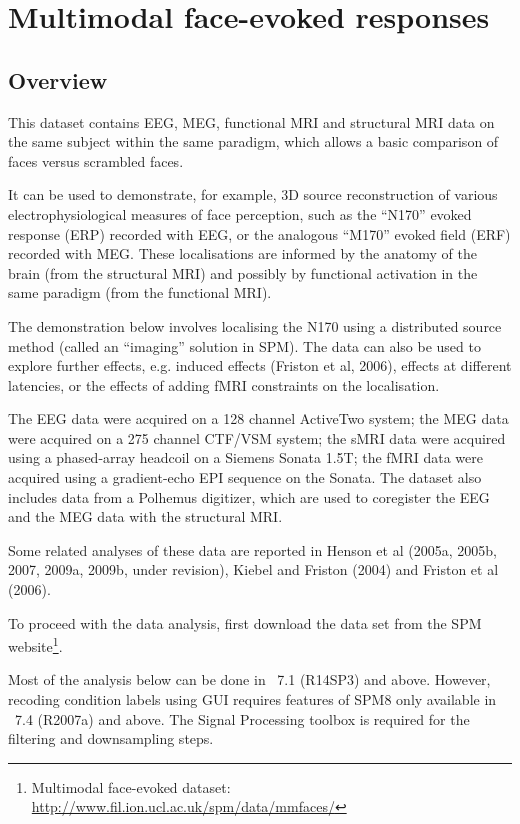 \chapter{Multimodal face-evoked responses \label{Chap:data:multimodal}}

\section{Overview}

This dataset contains EEG, MEG, functional MRI and structural MRI data on the same subject within the same paradigm, which allows a basic comparison of faces versus scrambled faces.

It can be used to demonstrate, for example, 3D source reconstruction of various electrophysiological measures of face perception, such as the ``N170'' evoked response (ERP) recorded with EEG, or the analogous ``M170'' evoked field (ERF) recorded with MEG. These localisations are informed by the anatomy of the brain (from the structural MRI) and possibly by functional activation in the same paradigm (from the functional MRI).

The demonstration below involves localising the N170 using a distributed source method (called an ``imaging'' solution in SPM). The data can also be used to explore further effects, e.g. induced effects (Friston et al, 2006), effects at different latencies, or the effects of adding fMRI constraints on the localisation.

The EEG data were acquired on a 128 channel ActiveTwo system; the MEG data were acquired on a 275 channel CTF/VSM system; the sMRI data were acquired using a phased-array headcoil on a Siemens Sonata 1.5T; the fMRI data were acquired using a gradient-echo EPI sequence on the Sonata. The dataset also includes data from a Polhemus digitizer, which are used to coregister the EEG and the MEG data with the structural MRI.

Some related analyses of these data are reported in Henson et al (2005a, 2005b, 2007, 2009a, 2009b, under revision), Kiebel and Friston (2004) and Friston et al (2006).

To proceed with the data analysis, first download the  data set from the SPM website\footnote{Multimodal face-evoked dataset: \url{http://www.fil.ion.ucl.ac.uk/spm/data/mmfaces/}}.

Most of the analysis below can be done in \matlab\ 7.1 (R14SP3) and above. However, recoding condition labels using GUI requires features of SPM8 only available in \matlab\ 7.4 (R2007a) and above. The Signal Processing toolbox is required for the filtering and downsampling steps.

